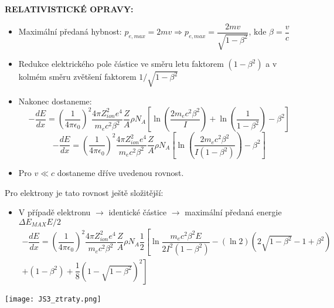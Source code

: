 \documentclass[../../main.tex]{subfiles}
\begin{document}
\textbf{RELATIVISTICKÉ OPRAVY:}
\begin{itemize}
	\item Maximální předaná hybnost: $p_{e,max} = 2 mv \Rightarrow p_{e,max} = \dfrac{2mv}{\sqrt{1 - \beta^2 }}$, kde $\beta = \dfrac{v}{c}$
	\item Redukce elektrického pole částice ve směru letu faktorem $(1 - \beta^2)$ a v kolmém směru zvětšení faktorem $1 / \sqrt{1 - \beta^2}$
	\item Nakonec dostaneme:
	\begin{equation}
	- \dfrac{dE}{dx} =  \left( \dfrac{1}{4 \pi \epsilon_0} \right) ^2 \dfrac{4\pi Z_{ion}^2 e^4}{m_e c^2 \beta^2} \dfrac{Z}{A} \rho N_A \left[\ln \left( \dfrac{2 m_e c^2 \beta^2 }{I}\right) + \ln \left(\dfrac{1}{1 - \beta^2} \right)  - \beta^2 \right] 
	\end{equation}
	\begin{equation}
	- \dfrac{dE}{dx} = \left( \dfrac{1}{4 \pi \epsilon_0} \right) ^2 \dfrac{4\pi Z_{ion}^2 e^4}{m_e c^2 \beta^2} \dfrac{Z}{A} \rho N_A \left[\ln \left( \dfrac{2 m_e c^2 \beta^2}{I(1- \beta^2)}\right) - \beta^2 \right] 
	\end{equation}
	\item Pro $v \ll c$ dostaneme dříve uvedenou rovnost.
\end{itemize}

Pro elektrony je tato rovnost ještě složitější:
\begin{itemize}
	\item V případě elektronu $\rightarrow$ identické částice $\rightarrow$ maximální předaná energie $\Delta E_{MAX} E/2$
	\begin{equation}
	\begin{gathered}
	- \dfrac{dE}{dx} = \left( \dfrac{1}{4 \pi \epsilon_0} \right) ^2 \dfrac{4\pi Z_{ion}^2 e^4}{m_e c^2 \beta^2} \dfrac{Z}{A} \rho N_A \dfrac{1}{2} \left[ \ln \dfrac{m_e c^2 \beta^2 E}{2 I^2 (1 - \beta^2)} - (\ln 2) (2\sqrt{1 - \beta^2} - 1 + \beta^2) \right. \\ \left. + (1 - \beta^2) + \dfrac{1}{8} (1 - \sqrt{1 - \beta^2}) ^2 \right] 
	\end{gathered}
	\end{equation}
\end{itemize}

\begin{center}
	\texttt{[image: JS3\_ztraty.png]}
\end{center}
\end{document}
